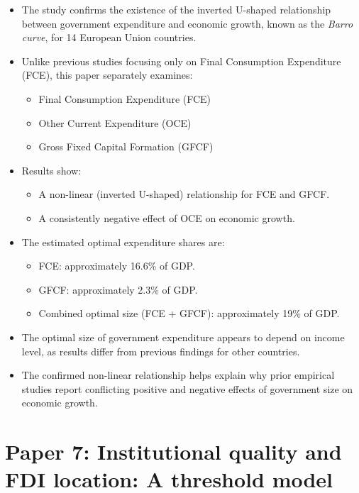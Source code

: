 \documentclass[10pt, oneside]{article}
\begin{document}
\begin{itemize}
	\item The study confirms the existence of the inverted U-shaped relationship between government expenditure and economic growth, known as the \textit{Barro curve}, for 14 European Union countries.
	\item Unlike previous studies focusing only on Final Consumption Expenditure (FCE), this paper separately examines:
	      \begin{itemize}
		      \item Final Consumption Expenditure (FCE)
		      \item Other Current Expenditure (OCE)
		      \item Gross Fixed Capital Formation (GFCF)
	      \end{itemize}
	\item Results show:
	      \begin{itemize}
		      \item A non-linear (inverted U-shaped) relationship for FCE and GFCF.
		      \item A consistently negative effect of OCE on economic growth.
	      \end{itemize}
	\item The estimated optimal expenditure shares are:
	      \begin{itemize}
		      \item FCE: approximately 16.6\% of GDP.
		      \item GFCF: approximately 2.3\% of GDP.
		      \item Combined optimal size (FCE + GFCF): approximately 19\% of GDP.
	      \end{itemize}
	\item The optimal size of government expenditure appears to depend on income level, as results differ from previous findings for other countries.
	\item The confirmed non-linear relationship helps explain why prior empirical studies report conflicting positive and negative effects of government size on economic growth.
\end{itemize}

\section{Paper 7: Institutional quality and FDI location: A threshold model}
\end{document}
